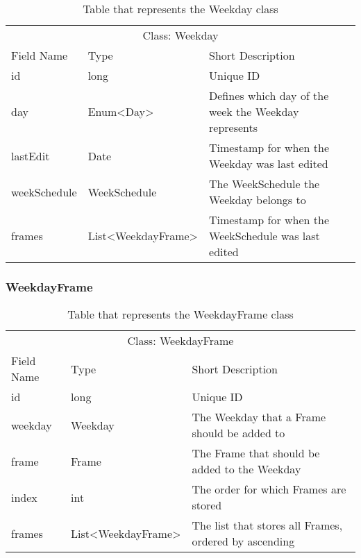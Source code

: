 \begin{table}[]
\centering
\caption{Table that represents the Weekday class}
\label{tbl:Weekday}
\begin{tabular}{lll}
\multicolumn{3}{c}{Class: Weekday}                                                                           \\
Field Name   & Type                                   & Short Description                                    \\
id           & long                                   & Unique ID                                            \\
day          & Enum\textless Day\textgreater          & Defines which day of the week the Weekday represents \\
lastEdit     & Date                                   & Timestamp for when the Weekday was last edited       \\
weekSchedule & WeekSchedule                           & The WeekSchedule the Weekday belongs to              \\
frames       & List\textless WeekdayFrame\textgreater & Timestamp for when the WeekSchedule was last edited 
\end{tabular}
\end{table}

\noindent
\begin{description}
    \item
    \item
    \item
\end{description}


\subsubsection{WeekdayFrame}

\begin{table}[]
\centering
\caption{Table that represents the WeekdayFrame class}
\label{tbl:WeekdayFrame}
\begin{tabular}{lll}
\multicolumn{3}{c}{Class: WeekdayFrame}                                                                     \\
Field Name & Type                                   & Short Description                                     \\
id         & long                                   & Unique ID                                             \\
weekday    & Weekday                                & The Weekday that a Frame should be added to           \\
frame      & Frame                                  & The Frame that should be added to the Weekday         \\
index      & int                                    & The order for which Frames are stored                 \\
frames     & List\textless WeekdayFrame\textgreater & The list that stores all Frames, ordered by ascending
\end{tabular}
\end{table}

